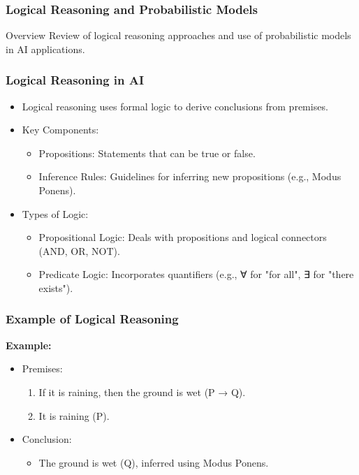 \documentclass[aspectratio=169]{beamer}
\begin{document}
\begin{frame}[fragile]
    \frametitle{Logical Reasoning and Probabilistic Models}
    \begin{block}{Overview}
        Review of logical reasoning approaches and use of probabilistic models in AI applications.
    \end{block}
\end{frame}

\begin{frame}[fragile]
    \frametitle{Logical Reasoning in AI}
    \begin{itemize}
        \item Logical reasoning uses formal logic to derive conclusions from premises.
        \item Key Components:
        \begin{itemize}
            \item Propositions: Statements that can be true or false.
            \item Inference Rules: Guidelines for inferring new propositions (e.g., Modus Ponens).
        \end{itemize}
        \item Types of Logic:
        \begin{itemize}
            \item Propositional Logic: Deals with propositions and logical connectors (AND, OR, NOT).
            \item Predicate Logic: Incorporates quantifiers (e.g., ∀ for "for all", ∃ for "there exists").
        \end{itemize}
    \end{itemize}
\end{frame}

\begin{frame}[fragile]
    \frametitle{Example of Logical Reasoning}
    \textbf{Example:}
    \begin{itemize}
        \item Premises:
        \begin{enumerate}
            \item If it is raining, then the ground is wet (P → Q).
            \item It is raining (P).
        \end{enumerate}
        \item Conclusion:
        \begin{itemize}
            \item The ground is wet (Q), inferred using Modus Ponens.
        \end{itemize}
    \end{itemize}
\end{frame}
\end{document}
